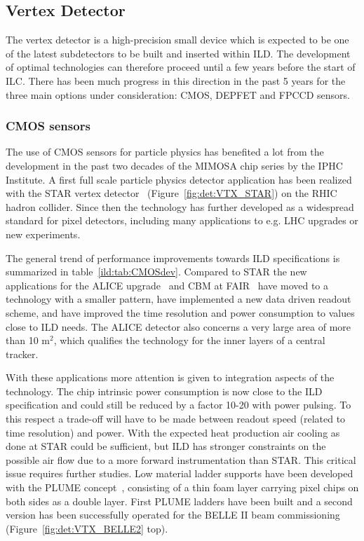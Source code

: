 \subsection{Vertex Detector}

The vertex detector is a high-precision small device which is expected to be one of the latest subdetectors to be built and inserted within ILD. The development of optimal technologies can therefore proceed until a few years before the start of ILC. There has been much progress in this direction in the past 5 years for the three main options under consideration: CMOS, DEPFET and FPCCD sensors.

\subsubsection{CMOS sensors}

The use of CMOS sensors for particle physics has benefited a lot from the development in the past two decades of the MIMOSA chip series by the IPHC Institute. A first full scale particle physics detector application has been realized with the STAR vertex detector~\cite{Contin:2017mck} (Figure~\ref{fig:det:VTX_STAR}) on the RHIC hadron collider. Since then the technology has further developed as a widespread standard for pixel detectors, including many applications to e.g. LHC upgrades or new experiments. 

The general trend of performance improvements towards ILD specifications is summarized in table~\ref{ild:tab:CMOSdev}. Compared to STAR the new applications for the ALICE upgrade~\cite{AglieriRinella:2017lym} and CBM at FAIR~\cite{Koziel:2017loo} have moved to a technology with a smaller pattern, have implemented a new data driven readout scheme, and have improved the time resolution and power consumption to values close to ILD needs. The ALICE detector also concerns a very large area of more than 10 m$^2$, which qualifies the technology for the inner layers of a central tracker.

With these applications more attention is given to integration aspects of the technology. The chip intrinsic power consumption is now close to the ILD specification and could still be reduced by a factor 10-20 with power pulsing. To this respect a trade-off will have to be made between readout speed (related to time resolution) and power. With the expected heat production air cooling as done at STAR could be sufficient, but ILD has stronger constraints on the possible air flow due to a more forward instrumentation than STAR. This critical issue requires further studies. Low material ladder supports have been developed with the PLUME concept~\cite{Nomerotski:2011zz}, consisting of a thin foam layer carrying pixel chips on both sides as a double layer. First PLUME ladders have been built and a second version has been successfully operated for the BELLE II beam commissioning (Figure~\ref{fig:det:VTX_BELLE2} top).

